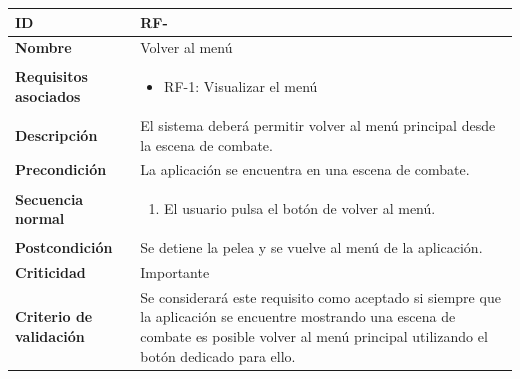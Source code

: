 \begin{center}
	\begin{tabular}{ | p{4.7cm} | p{10cm} | } 
		\hline
		
		\textbf{ID} & RF-\arabic{contador_requisitos_funcionales}
		{contador_requisitos_funcionales} \\
		
		\hline 
		\textbf{Nombre} &
		Volver al menú\\ 
		
		\hline
		\textbf{Requisitos asociados} & 
		\begin{itemize}
			\item RF-1: Visualizar el menú
		\end{itemize}\\
		
		\hline
		\textbf{Descripción} & 
		El sistema deberá permitir volver al menú principal desde la escena de combate.\\
		
		\hline
		\textbf{Precondición} & 
		La aplicación se encuentra en una escena de combate.\\
		
		\hline
		\textbf{Secuencia normal} &
		\begin{enumerate}
			\item El usuario pulsa el botón de volver al menú.
		\end{enumerate}
		\\
		
		\hline
		\textbf{Postcondición} & 
		Se detiene la pelea y se vuelve al menú de la aplicación.\\
		
		\hline 
		\textbf{Criticidad} &
		Importante\\
		
		\hline 
		\textbf{Criterio de validación} & 
		Se considerará este requisito como aceptado si siempre que la aplicación se encuentre mostrando una escena de combate es posible volver al menú principal utilizando el botón dedicado para ello.\\
		
		\hline
	\end{tabular}
\end{center}

